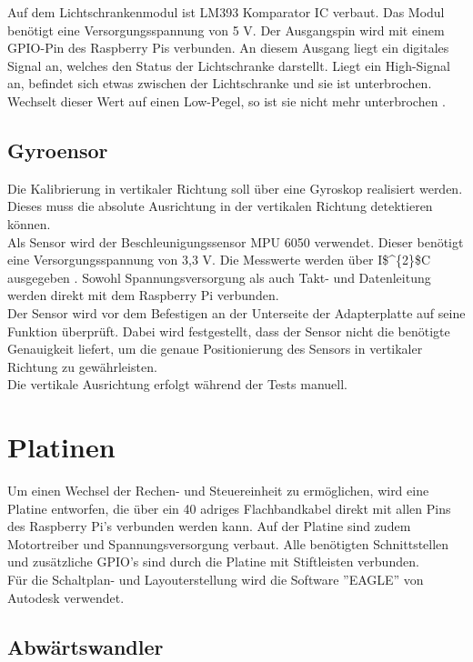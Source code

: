 Auf dem Lichtschrankenmodul ist LM393 Komparator \ac{IC} verbaut. Das Modul benötigt eine Versorgungsspannung von 5 V. Der Ausgangspin wird mit einem \ac{GPIO}-Pin des Raspberry Pis verbunden. An diesem Ausgang liegt ein digitales Signal an, welches den Status der Lichtschranke darstellt. Liegt ein High-Signal an, befindet sich etwas zwischen der Lichtschranke und sie ist unterbrochen. Wechselt dieser Wert auf einen Low-Pegel, so ist sie nicht mehr unterbrochen \cite{LM393}. 


\subsection{Gyroensor}


Die Kalibrierung in vertikaler Richtung soll über eine Gyroskop realisiert werden. Dieses muss die absolute Ausrichtung in der vertikalen Richtung detektieren können. \\ 
Als Sensor wird der Beschleunigungssensor MPU 6050 verwendet. Dieser benötigt eine Versorgungsspannung von 3,3 V. Die Messwerte werden über \ac{I$^{2}$C} ausgegeben \cite{MPU-6050}. Sowohl Spannungsversorgung als auch Takt- und Datenleitung werden direkt mit dem Raspberry Pi verbunden. \\ 
Der Sensor wird vor dem Befestigen an der Unterseite der Adapterplatte auf seine Funktion überprüft. Dabei wird festgestellt, dass der Sensor nicht die benötigte Genauigkeit liefert, um die genaue Positionierung des Sensors in vertikaler Richtung zu gewährleisten. \\
Die vertikale Ausrichtung erfolgt während der Tests manuell.


\section{Platinen}

Um einen Wechsel der Rechen- und Steuereinheit zu ermöglichen, wird eine Platine entworfen, die über ein 40 adriges Flachbandkabel direkt mit allen Pins des Raspberry Pi's verbunden werden kann. Auf der Platine sind zudem Motortreiber und Spannungsversorgung verbaut. Alle benötigten Schnittstellen und zusätzliche \ac{GPIO}’s sind durch die Platine mit Stiftleisten verbunden.\\
Für die Schaltplan- und Layouterstellung wird die Software ''EAGLE'' von Autodesk verwendet.


\subsection{Abwärtswandler} 

